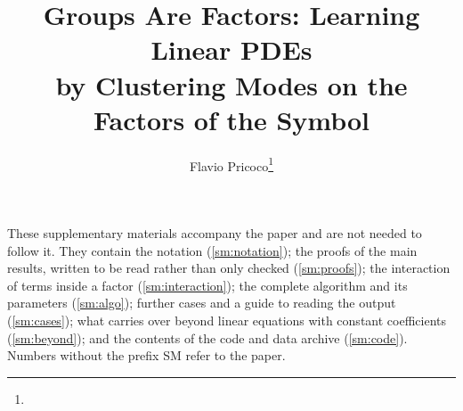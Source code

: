 \documentclass[11pt]{article}
\title{Groups Are Factors: Learning Linear PDEs\\by Clustering Modes on the Factors of the Symbol}
\author{Flavio Pricoco\thanks{\email{flaflapr@gmail.com}}}
\theoremstyle{plain}
\theoremstyle{definition}
\theoremstyle{remark}
\begin{document}
\maketitle

\noindent These supplementary materials accompany the paper and are not needed to follow it. They contain the notation
(\cref{sm:notation}); the proofs of the main results, written to be read rather than only checked
(\cref{sm:proofs}); the interaction of terms inside a factor (\cref{sm:interaction}); the complete algorithm and its
parameters (\cref{sm:algo}); further cases and a guide to reading the output (\cref{sm:cases}); what carries over
beyond linear equations with constant coefficients (\cref{sm:beyond}); and the contents of the code and data archive
(\cref{sm:code}). Numbers without the prefix SM refer to the paper.
\end{document}
